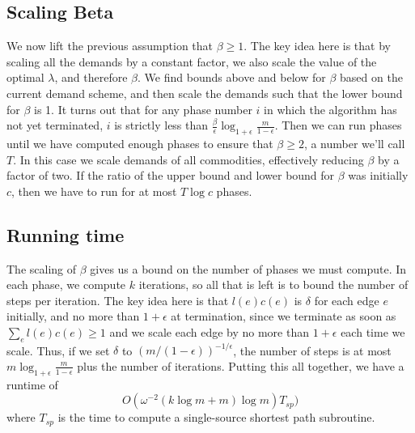 \subsection{Scaling Beta}
We now lift the previous assumption that $\beta\geq 1$. The key idea
here is that by scaling all the demands by a constant factor, we also
scale the value of the optimal $\lambda$, and therefore $\beta$. We
find bounds above and below for $\beta$ based on the current demand
scheme, and then scale the demands such that the lower bound for
$\beta$ is 1. It turns out that for any phase number $i$ in which the
algorithm has not yet terminated, $i$ is strictly less than
$\frac{\beta}{\epsilon}\log_{1+\epsilon}\frac{m}{1-\epsilon}$. Then we
can run phases until we have computed enough
phases to ensure that $\beta\geq 2$, a number we'll call $T$. In this case
we scale demands of
all commodities, effectively reducing $\beta$ by a factor of
two. If the ratio of the upper bound and lower bound for $\beta$ was
initially $c$, then we have to run for at most $T\log c$ phases.
\subsection{Running time}
The scaling of $\beta$ gives us a bound on the number of phases we
must compute. In each phase, we compute $k$ iterations, so all that is
left is to bound the number of steps per iteration. The key idea here
is that $l(e)c(e)$ is $\delta$ for each edge $e$ initially, and no
more than $1+\epsilon$ at termination, since we terminate as soon as
$\sum_el(e)c(e)\geq 1$ and we scale each edge by no more than
$1+\epsilon$ each time we scale. Thus, if we set $\delta$ to $(m/(1-\epsilon))^{-1/\epsilon}$, the number of steps is at most
$m\log_{1+\epsilon}\frac{m}{1-\epsilon}$ plus the number of
iterations. Putting this all together, we have a runtime of 
$$O(\omega^{-2}(k\log m+m)\log m)T_{sp})$$ where $T_{sp}$ is the time to
compute a single-source shortest path subroutine.

